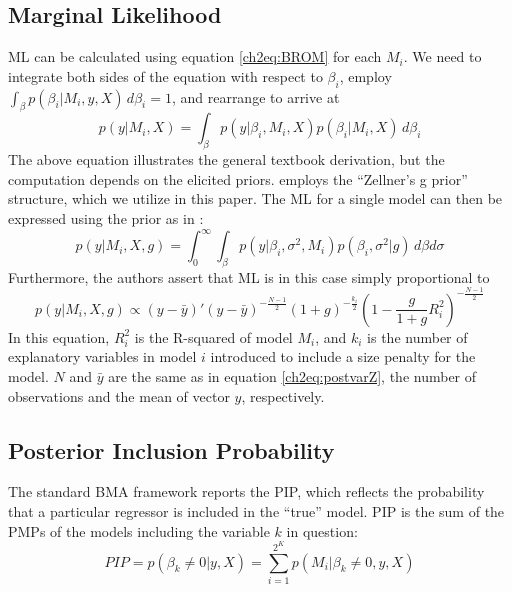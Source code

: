 \begin{refsection}
\subsection{Marginal Likelihood}\label{ch2sec:ML}
\ac{ML} can be calculated using equation \ref{ch2eq:BROM} for each $M_{i}$. We need to integrate both sides of the equation with respect to $\beta_{i}$, employ $\int_{\beta} p(\beta_{i}\vert M_{i},y,X) \, d\beta_{i}=1$, and rearrange to arrive at
%
\begin{equation}\label{ch2eq:ML}
	p(y \vert  M_{i},X) = \int_{\beta}{p(y \vert \beta_{i},M_{i},X)p(\beta_{i} \vert M_{i},X) \, d\beta_{i}}
\end{equation}
The above equation illustrates the general textbook derivation, but the computation depends on the elicited priors. \textcite{Zeugner2011} employs the ``Zellner's g prior'' structure, which we utilize in this paper. The \ac{ML} for a single model can then be expressed using the prior as in \textcite{FeldkircherZeugner2009}:
\begin{equation}\label{ch2eq:MLFZ}
	p(y \vert  M_{i},X,g) = \int_{0}^{\infty}{\int_{\beta}{p(y \vert \beta_{i}, \sigma^{2},M_{i})p(\beta_{i},\sigma^{2} \vert g) \, d\beta d\sigma}}
\end{equation}
Furthermore, the authors assert that \ac{ML} is in this case simply proportional to
%
\begin{equation}\label{ch2eq:MLg}
	p(y \vert M_{i}, X, g) \propto (y-\bar{y})'(y-\bar{y})^{- \frac{N-1}{2}} (1+g)^{- \frac{k_{i}}{2}} \left(1- \frac{g}{1+g}R^{2}_{i} \right)^{- \frac{N-1}{2}}
\end{equation}
In this equation, $R^{2}_{i}$ is the R-squared of model $M_{i}$, and $k_{i}$ is the number of explanatory variables in model $i$ introduced to include a size penalty for the model. $N$ and $\bar{y}$ are the same as in equation \ref{ch2eq:postvarZ}, the number of observations and the mean of vector $y$, respectively.
\subsection{Posterior Inclusion Probability}
The standard \ac{BMA} framework reports the \ac{PIP}, which reflects the probability that a particular regressor is included in the ``true'' model. \ac{PIP} is the sum of the \acp{PMP} of the models including the variable $k$ in question:
\begin{equation}\label{ch2eq:PIP}
	PIP = p(\beta_{k} \neq 0 \vert y, X) = \sum_{i=1}^{2^{K}} p(M_{i} \vert \beta_{k} \neq 0, y, X)
\end{equation}

\end{refsection}
